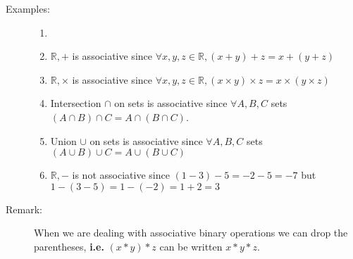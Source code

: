 \documentclass[10pt]{article}
\begin{document}
\begin{description}
		\item[Examples:]
		\begin{enumerate}
			\item[]
			\item $\mathbb{R}, +$ is associative since $\forall x, y, z \in \mathbb{R}, (x+y)+z=x+(y+z)$
			\item $\mathbb{R}, \times$ is associative since $\forall x, y, z \in \mathbb{R}, (x \times y) \times z = x \times (y \times z)$
			\item Intersection $\cap$ on sets is associative since $\forall A, B, C$ sets $(A \cap B) \cap C = A \cap (B \cap C)$.
			\item Union $\cup$ on sets is associative since $\forall A, B, C$ sets $(A \cup B) \cup C = A \cup (B \cup C)$
			\item $\mathbb{R}, -$ is not associative since $(1-3)-5 = -2-5 =-7$ but $1-(3-5)=1-(-2)=1+2=3$
		\end{enumerate}
		\item[Remark:] When we are dealing with associative binary operations we can drop the parentheses, \textbf{i.e.} $(x*y)*z$ can be written $x*y*z$.
	\end{description}
	
\end{document}
